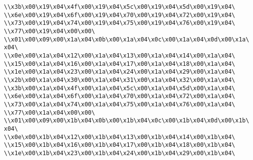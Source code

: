 \verb|\\x3b\x00\x19\x04\x4f\x00\x19\x04\x5c\x00\x19\x04\x5d\x00\x19\x04\|\newline
\verb|\\x6e\x00\x19\x04\x6f\x00\x19\x04\x70\x00\x19\x04\x72\x00\x19\x04\|\newline
\verb|\\x73\x00\x19\x04\x74\x00\x19\x04\x75\x00\x19\x04\x76\x00\x19\x04\|\newline
\verb|\\x77\x00\x19\x04\x00\x00\|\newline
\verb|\\x01\x00\x09\x00\x1a\x04\x0b\x00\x1a\x04\x0c\x00\x1a\x04\x0d\x00\x1a\x04\|\newline
\verb|\\x0e\x00\x1a\x04\x12\x00\x1a\x04\x13\x00\x1a\x04\x14\x00\x1a\x04\|\newline
\verb|\\x15\x00\x1a\x04\x16\x00\x1a\x04\x17\x00\x1a\x04\x18\x00\x1a\x04\|\newline
\verb|\\x1e\x00\x1a\x04\x23\x00\x1a\x04\x24\x00\x1a\x04\x29\x00\x1a\x04\|\newline
\verb|\\x2b\x00\x1a\x04\x30\x00\x1a\x04\x31\x00\x1a\x04\x32\x00\x1a\x04\|\newline
\verb|\\x3b\x00\x1a\x04\x4f\x00\x1a\x04\x5c\x00\x1a\x04\x5d\x00\x1a\x04\|\newline
\verb|\\x6e\x00\x1a\x04\x6f\x00\x1a\x04\x70\x00\x1a\x04\x72\x00\x1a\x04\|\newline
\verb|\\x73\x00\x1a\x04\x74\x00\x1a\x04\x75\x00\x1a\x04\x76\x00\x1a\x04\|\newline
\verb|\\x77\x00\x1a\x04\x00\x00\|\newline
\verb|\\x01\x00\x09\x00\x1b\x04\x0b\x00\x1b\x04\x0c\x00\x1b\x04\x0d\x00\x1b\x04\|\newline
\verb|\\x0e\x00\x1b\x04\x12\x00\x1b\x04\x13\x00\x1b\x04\x14\x00\x1b\x04\|\newline
\verb|\\x15\x00\x1b\x04\x16\x00\x1b\x04\x17\x00\x1b\x04\x18\x00\x1b\x04\|\newline
\verb|\\x1e\x00\x1b\x04\x23\x00\x1b\x04\x24\x00\x1b\x04\x29\x00\x1b\x04\|\newline
